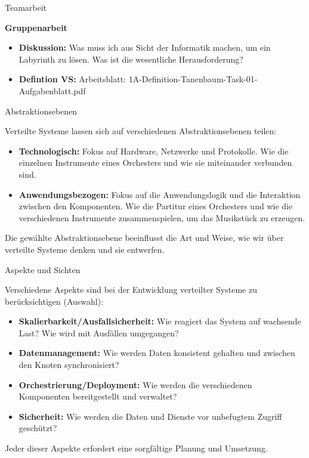 \documentclass{beamer}
\begin{document}
\begin{frame}{Teamarbeit}

   \textbf{Gruppenarbeit}

    \begin{itemize}
        \item \textbf{Diskussion:} Was muss ich aus Sicht der Informatik machen, um ein Labyrinth zu lösen. Was ist die wesentliche Herausforderung?
        \item \textbf{Defintion VS:} Arbeitsblatt: 1A-Definition-Tanenbaum-Task-01-Aufgabenblatt.pdf
    \end{itemize}

\end{frame}

\begin{frame}{Abstraktionsebenen}

    Verteilte Systeme lassen sich auf verschiedenen Abstraktionsebenen teilen:

    \begin{itemize}
        \item \textbf{Technologisch:} Fokus auf Hardware, Netzwerke und Protokolle.  Wie die einzelnen Instrumente eines Orchesters und wie sie miteinander verbunden sind.
        \item \textbf{Anwendungsbezogen:} Fokus auf die Anwendungslogik und die Interaktion zwischen den Komponenten.  Wie die Partitur eines Orchesters und wie die verschiedenen Instrumente zusammenspielen, um das Musikstück zu erzeugen.
    \end{itemize}

    Die gewählte Abstraktionsebene beeinflusst die Art und Weise, wie wir über verteilte Systeme denken und sie entwerfen.

\end{frame}


\begin{frame}{Aspekte und Sichten}

    Verschiedene Aspekte sind bei der Entwicklung verteilter Systeme zu berücksichtigen (Auswahl):

    \begin{itemize}
        \item \textbf{Skalierbarkeit/Ausfallsicherheit:}  Wie reagiert das System auf wachsende Last? Wie wird mit Ausfällen umgegangen?
        \item \textbf{Datenmanagement:} Wie werden Daten konsistent gehalten und zwischen den Knoten synchronisiert?
        \item \textbf{Orchestrierung/Deployment:} Wie werden die verschiedenen Komponenten bereitgestellt und verwaltet?
        \item \textbf{Sicherheit:} Wie werden die Daten und Dienste vor unbefugtem Zugriff geschützt?
    \end{itemize}

    Jeder dieser Aspekte erfordert eine sorgfältige Planung und Umsetzung.

\end{frame}
\end{document}
